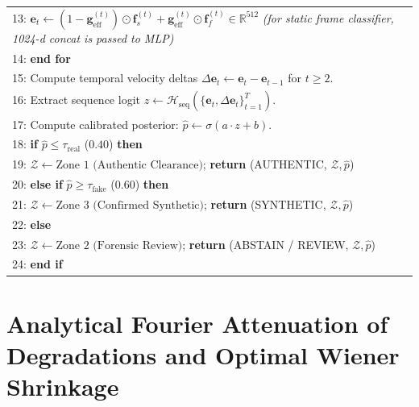 \documentclass[10pt,twocolumn,letterpaper]{article}
\begin{document}
\begin{table}[h]
\begin{tabular}{p{}}
13: \quad $\mathbf{e}_t \leftarrow (1 - \mathbf{g}_{\mathrm{eff}}^{(t)}) \odot \mathbf{f}_s^{(t)} + \mathbf{g}_{\mathrm{eff}}^{(t)} \odot \mathbf{f}_f^{(t)} \in \mathbb{R}^{512}$ \quad\textit{(for static frame classifier, 1024-d concat is passed to MLP)} \\
14: \textbf{end for} \\
15: Compute temporal velocity deltas $\Delta \mathbf{e}_t \leftarrow \mathbf{e}_t - \mathbf{e}_{t-1}$ for $t \ge 2$. \\
16: Extract sequence logit $z \leftarrow \mathcal{H}_{\mathrm{seq}}(\{\mathbf{e}_t, \Delta \mathbf{e}_t\}_{t=1}^T)$. \\
17: Compute calibrated posterior: $\hat{p} \leftarrow \sigma(a \cdot z + b)$. \\
18: \textbf{if} $\hat{p} \le \tau_{\mathrm{real}}$ ($0.40$) \textbf{then} \\
19: \quad $\mathcal{Z} \leftarrow \text{Zone 1 (Authentic Clearance)}$; \quad \textbf{return} (AUTHENTIC, $\mathcal{Z}, \hat{p}$) \\
20: \textbf{else if} $\hat{p} \ge \tau_{\mathrm{fake}}$ ($0.60$) \textbf{then} \\
21: \quad $\mathcal{Z} \leftarrow \text{Zone 3 (Confirmed Synthetic)}$; \quad \textbf{return} (SYNTHETIC, $\mathcal{Z}, \hat{p}$) \\
22: \textbf{else} \\
23: \quad $\mathcal{Z} \leftarrow \text{Zone 2 (Forensic Review)}$; \quad \textbf{return} (ABSTAIN / REVIEW, $\mathcal{Z}, \hat{p}$) \\
24: \textbf{end if} \\
\bottomrule
\end{tabular}
\label{alg:inference}
\end{table}

\section{Analytical Fourier Attenuation of Degradations and Optimal Wiener Shrinkage}
\label{app:blur_derivation}
\end{document}
